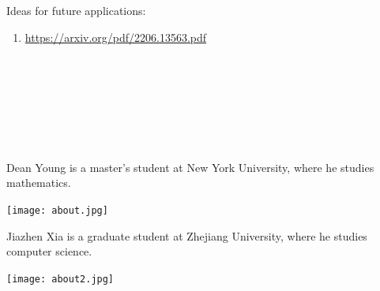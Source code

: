 \documentclass{book}
\theoremstyle{definition}
\newcounter{lcounter}
\begin{document}

Ideas for future applications:

\begin{enumerate}
\item \url{https://arxiv.org/pdf/2206.13563.pdf}
\end{enumerate}





\newpage 
\ \\
\ \\
\ \\
\ \\
\ \\
\ \\
\begin{center}
\begin{tcolorbox}[width=5in,colback={white},title={\begin{center}\texttt{About the Author} \addtocounter{lcounter}{1}  \end{center}},colbacktitle=Yellow,coltitle=black]
Dean Young is a master's student at New York University, where he studies mathematics. \\
\begin{center}
\texttt{[image: about.jpg]}
\end{center}
\end{tcolorbox}
\end{center}

\begin{center}
\begin{tcolorbox}[width=5in,colback={white},title={\begin{center}\texttt{About the Author} \addtocounter{lcounter}{1}  \end{center}},colbacktitle=Yellow,coltitle=black]
Jiazhen Xia is a graduate student at Zhejiang University, where he studies computer science. \\
\begin{center}
\texttt{[image: about2.jpg]}
\end{center}
\end{tcolorbox}
\end{center}
\newpage
\ \\
\thispagestyle{empty}
\end{document}
